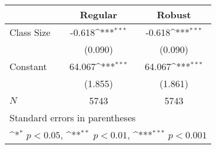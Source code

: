 {
\def\sym#1{\ifmmode^{#1}\else\(^{#1}\)\fi}
\begin{tabular}{l*{2}{c}}
\hline\hline
            &\multicolumn{1}{c}{Regular}&\multicolumn{1}{c}{Robust}\\
\hline
Class Size  &      -0.618\sym{***}&      -0.618\sym{***}\\
            &     (0.090)         &     (0.090)         \\
[1em]
Constant    &      64.067\sym{***}&      64.067\sym{***}\\
            &     (1.855)         &     (1.861)         \\
\hline
\(N\)       &        5743         &        5743         \\
\hline\hline
\multicolumn{3}{l}{\footnotesize Standard errors in parentheses}\\
\multicolumn{3}{l}{\footnotesize \sym{*} \(p<0.05\), \sym{**} \(p<0.01\), \sym{***} \(p<0.001\)}\\
\end{tabular}
}
